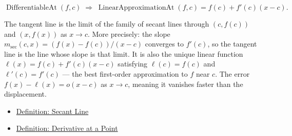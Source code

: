 \begin{remark*}
\[
\operatorname{DifferentiableAt}(f, c) \;\Rightarrow\;
\operatorname{LinearApproximationAt}(f, c) = f(c) + f'(c)(x - c).
\]
\end{remark*}

\begin{remark*}[Interpretation]
The tangent line is the limit of the family of secant lines through $(c, f(c))$ and $(x, f(x))$ as $x \to c$. More precisely: the slope $m_{\mathrm{sec}}(c, x) = (f(x)-f(c))/(x-c)$ converges to $f'(c)$, so the tangent line is the line whose slope is that limit. It is also the unique linear function $\ell(x) = f(c) + f'(c)(x-c)$ satisfying $\ell(c) = f(c)$ and $\ell'(c) = f'(c)$ --- the best first-order approximation to $f$ near $c$. The error $f(x) - \ell(x) = o(x-c)$ as $x \to c$, meaning it vanishes faster than the displacement.
\end{remark*}

\begin{dependencies}
\begin{itemize}
  \item \hyperref[def:secant-line]{Definition: Secant Line}
  \item \hyperref[def:derivative-at-a-point]{Definition: Derivative at a Point}
\end{itemize}
\end{dependencies}


